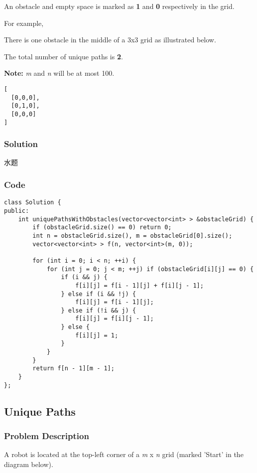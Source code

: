 \documentclass[courier]{article}
\begin{document}
\begin{CJK*}{UTF8}{gkai}
An obstacle and empty space is marked as \textbf{1} and \textbf{0} respectively in the grid.

For example,


There is one obstacle in the middle of a 3x3 grid as illustrated below.

The total number of unique paths is \textbf{2}.

\textbf{Note:} \emph{m} and \emph{n} will be at most 100.

\begin{verbatim}
[
  [0,0,0],
  [0,1,0],
  [0,0,0]
]
\end{verbatim}


\subsubsection*{Solution}
水题

\subsubsection*{Code}
\begin{lstlisting}
class Solution {
public:
    int uniquePathsWithObstacles(vector<vector<int> > &obstacleGrid) {
        if (obstacleGrid.size() == 0) return 0;
        int n = obstacleGrid.size(), m = obstacleGrid[0].size();
        vector<vector<int> > f(n, vector<int>(m, 0));
        
        for (int i = 0; i < n; ++i) {
            for (int j = 0; j < m; ++j) if (obstacleGrid[i][j] == 0) {
                if (i && j) {
                    f[i][j] = f[i - 1][j] + f[i][j - 1];
                } else if (i && !j) {
                    f[i][j] = f[i - 1][j];
                } else if (!i && j) {
                    f[i][j] = f[i][j - 1];
                } else {
                    f[i][j] = 1;
                }
            }
        }
        return f[n - 1][m - 1];
    }
}; 
\end{lstlisting}


\subsection{ Unique Paths }

\subsubsection*{Problem Description}
A robot is located at the top-left corner of a \emph{m} x \emph{n} grid (marked 'Start' in the diagram below).


\end{CJK*}
\end{document}
